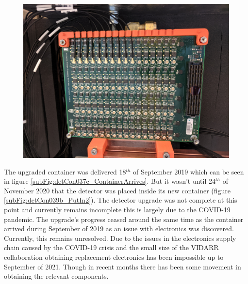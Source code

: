 \begin{figure}[htbp]
\centering
\includegraphics[width=0.8\linewidth]{Chapter3/Figs/Raster/detCon032_ConnectedBoard.png}
\label{fig:detCon032_ConnectedBoard}
\end{figure}

The upgraded container was delivered 18$^{th}$ of September 2019 which can be seen in figure  \ref{subFig:detCon037c_ContainerArrives}. But it wasn't until 24$^{th}$ of November 2020 that the detector was placed inside its new container (figure \ref{subFig:detCon039b_PutIn2}). The detector upgrade was not complete at this point and currently remains incomplete this is largely due to the COVID-19 pandemic. The upgrade's progress ceased around the same time as the container arrived during September of 2019 as an issue with electronics was discovered. Currently, this remains unresolved. Due to the issues in the electronics supply chain caused by the COVID-19 crisis and the small size of the VIDARR collaboration obtaining replacement electronics has been impossible up to September of 2021. Though in recent months there has been some movement in obtaining the relevant components. 

